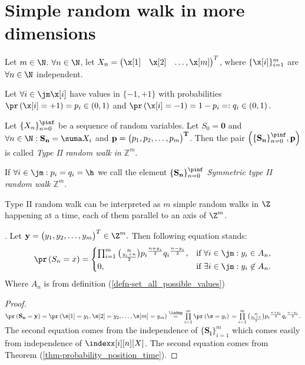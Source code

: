 \chapter{Simple random walk in more dimensions}
\renewcommand{\rw}{$\left( \{\mathbf{\mathbf{S_n}}\}_{n=0}^\pinf, \mathbf{p}\right)$}

\begin{defn}\label{defn-type_II}
  Let $m \in \N$. $\forall n \in \N$, let $X_n=\begin{pmatrix} \x[1] & \x[2]& \ldots, \x[m]\end{pmatrix}^T$, where $\{\x[i]\}_{i=1}^{m}$ are $\forall n \in \N$ independent.

  Let $\forall i \in \jm \x[i]$ have values in $\{-1,+1\}$ with probabilities $\pr \left(\x[i]=+1\right)=p_i \in \left(0,1\right)$ and $\pr \left(\x[i]=-1\right)=1-p_i=:q_i \in  \left(0,1 \right).$

  Let $\{X_n\}_{n=0}^\pinf$ be a sequence of \iid random variables. Let $S_0=\mathbf{0}$ and $\forall n \in \N: \mathbf{S_n}=\suma X_i$ and $\bf{p}=\begin{pmatrix}
   p_1, p_2, \ldots, p_m
 \end{pmatrix}^T$. Then the pair $\left(\{\mathbf{S_n}\}_{n=0}^\pinf, \mathbf{p} \right)$ is called \emph{Type II random walk in $\mathbb{Z}^m$}.

  If $\forall i \in \jm: p_i=q_i=\h$ we call the element $\{\mathbf{S_n}\}_{n=0}^\pinf$ \emph{Symmetric type II random walk $\mathbb{Z}^m$}.
\end{defn}
\begin{rem}
  Type II random walk can be interpreted as $m$ simple random walks in $\Z$ happening at a time, each of them parallel to an axis of $\Z^m$.
\end{rem}

\begin{thm}
  \Lrwm. Let $\mathbf{y}=\begin{pmatrix}
   y_1, y_2, \ldots, y_m
  \end{pmatrix}^T\in \Z^m.$ Then following equation stands:
  \[
  \pr \left( S_n=x \right) =
  \begin{cases}
  \prod_{i=1}^{m}\binom{n}{\frac{y_i+n}{2}}{p_i}^{\frac{n+y_i}{2}}{q_i}^{\frac{n-y_i}{2}}, & \text{if $\forall i \in \jm:y_i\in A_n$},\\
  0, & \text{if $\exists i \in \jm:y_i\not\in A_n$}.
  \end{cases}
  \]
  Where $A_n$ is from definition (\ref{defn-set_all_possible_values})
\end{thm}
\begin{proof}
  $\pr\left(\mathbf{S_n}=\mathbf{y}\right)
    =\pr\left( \s[1]=y_1, \s[2]=y_2, \ldots, \s[m]=y_m\right)
    \overset{\indep}{=}\prod\limits_{i=1}^{m}\pr\left(\s =y_i\right)\\
    =\prod\limits_{i=1}^{m}\binom{n}{\frac{y_i+n}{2}}{p_i}^{\frac{n+y_i}{2}}{q_i}^{\frac{n-y_i}{2}}.$ The second equation comes from the independence of $\{\mathbf{S_i}\}_{i=1}^m$ which comes easily from independence of $\indexx[i][n][X]$. The second equation comes from Theorem (\ref {thm-probability_position_time}).
\end{proof}

